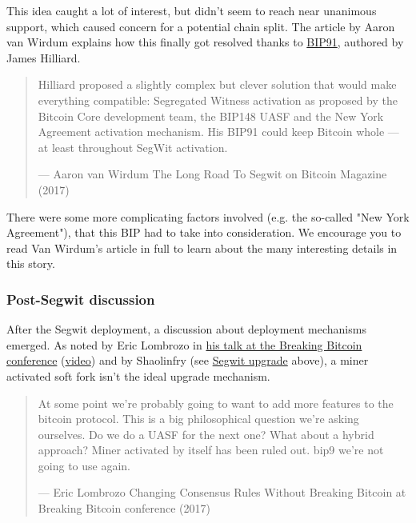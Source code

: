 This idea caught a lot of interest, but didn't seem to reach near
unanimous support, which caused concern for a potential chain split. The
article by Aaron van Wirdum explains how this finally got resolved
thanks to
\href{https://github.com/bitcoin/bips/blob/master/bip-0091.mediawiki}{BIP91},
authored by James Hilliard.

\begin{quote}
Hilliard proposed a slightly complex but clever solution that would make
everything compatible: Segregated Witness activation as proposed by the
Bitcoin Core development team, the BIP148 UASF and the New York
Agreement activation mechanism. His BIP91 could keep Bitcoin whole ---
at least throughout SegWit activation.

---  Aaron van Wirdum The Long Road To Segwit on Bitcoin Magazine (2017)
\end{quote}

There were some more complicating factors involved (e.g. the so-called
"New York Agreement"), that this BIP had to take into consideration. We
encourage you to read Van Wirdum's article in full to learn about the
many interesting details in this story.

\hypertarget{_post_segwit_discussion}{%
\subsubsection{Post-Segwit discussion}\label{_post_segwit_discussion}}

After the Segwit deployment, a discussion about deployment mechanisms
emerged. As noted by Eric Lombrozo in
\href{https://btctranscripts.com/breaking-bitcoin/2017/changing-consensus-rules-without-breaking-bitcoin/}{his
talk at the Breaking Bitcoin conference}
(\href{https://www.youtube.com/watch?v=0WCaoGiAOHE\&t=1926s}{video}) and
by Shaolinfry (see \protect\hyperlink{segwit-upgrade}{Segwit upgrade}
above), a miner activated soft fork isn't the ideal upgrade mechanism.

\begin{quote}
At some point we're probably going to want to add more features to the
bitcoin protocol. This is a big philosophical question we're asking
ourselves. Do we do a UASF for the next one? What about a hybrid
approach? Miner activated by itself has been ruled out. bip9 we're not
going to use again.

---  Eric Lombrozo Changing Consensus Rules Without Breaking Bitcoin at
Breaking Bitcoin conference (2017)
\end{quote}

